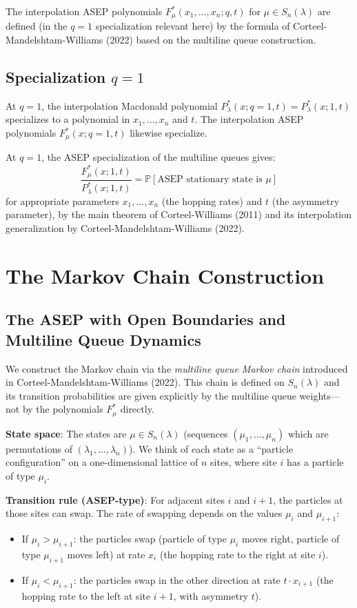 \documentclass[12pt]{article}
\theoremstyle{definition}
\begin{document}
The interpolation ASEP polynomials $F^*_\mu(x_1,\ldots,x_n;q,t)$ for $\mu \in S_n(\lambda)$ are defined (in the $q=1$ specialization relevant here) by the formula of Corteel-Mandelshtam-Williams (2022) based on the multiline queue construction.

\subsection{Specialization $q=1$}

At $q=1$, the interpolation Macdonald polynomial $P^*_\lambda(x;q=1,t) = P^*_\lambda(x;1,t)$ specializes to a polynomial in $x_1,\ldots,x_n$ and $t$. The interpolation ASEP polynomials $F^*_\mu(x;q=1,t)$ likewise specialize.

At $q=1$, the ASEP specialization of the multiline queues gives:
$$\frac{F^*_\mu(x;1,t)}{P^*_\lambda(x;1,t)} = \mathbb{P}[\text{ASEP stationary state is }\mu]$$
for appropriate parameters $x_1,\ldots,x_n$ (the hopping rates) and $t$ (the asymmetry parameter), by the main theorem of Corteel-Williams (2011) and its interpolation generalization by Corteel-Mandelshtam-Williams (2022).

\section{The Markov Chain Construction}

\subsection{The ASEP with Open Boundaries and Multiline Queue Dynamics}

We construct the Markov chain via the \emph{multiline queue Markov chain} introduced in Corteel-Mandelshtam-Williams (2022). This chain is defined on $S_n(\lambda)$ and its transition probabilities are given explicitly by the multiline queue weights—not by the polynomials $F^*_\mu$ directly.

\textbf{State space}: The states are $\mu \in S_n(\lambda)$ (sequences $(\mu_1,\ldots,\mu_n)$ which are permutations of $(\lambda_1,\ldots,\lambda_n)$). We think of each state as a ``particle configuration'' on a one-dimensional lattice of $n$ sites, where site $i$ has a particle of type $\mu_i$.

\textbf{Transition rule (ASEP-type)}: For adjacent sites $i$ and $i+1$, the particles at those sites can swap. The rate of swapping depends on the values $\mu_i$ and $\mu_{i+1}$:
\begin{itemize}
\item If $\mu_i > \mu_{i+1}$: the particles swap (particle of type $\mu_i$ moves right, particle of type $\mu_{i+1}$ moves left) at rate $x_i$ (the hopping rate to the right at site $i$).
\item If $\mu_i < \mu_{i+1}$: the particles swap in the other direction at rate $t \cdot x_{i+1}$ (the hopping rate to the left at site $i+1$, with asymmetry $t$).
\end{itemize}
\end{document}
